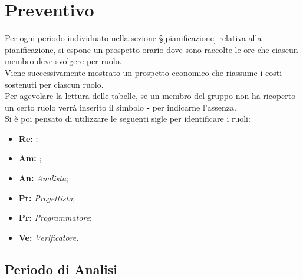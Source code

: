 \section{Preventivo}
\label{preventivo}
Per ogni periodo individuato nella sezione \S\ref{pianificazione} relativa alla pianificazione, si espone un prospetto orario dove sono raccolte le ore che ciascun membro deve svolgere per ruolo. \\ Viene successivamente mostrato un prospetto economico che riassume i costi sostenuti per ciascun ruolo.\\
Per agevolare la lettura delle tabelle, se un membro del gruppo non ha ricoperto un certo ruolo verrà inserito il simbolo \textbf{-} per indicarne l'assenza. \\ Si è poi pensato di utilizzare le seguenti sigle per identificare i ruoli:
\begin{itemize}
\item \textbf{Re:} \textit{\Responsabile};
\item \textbf{Am:} \textit{\Amministratore};
\item \textbf{An:} \textit{Analista};
\item \textbf{Pt:} \textit{Progettista};
\item \textbf{Pr:} \textit{Programmatore};
\item \textbf{Ve:} \textit{Verificatore}.
\end{itemize}

\subsection{Periodo di Analisi}
